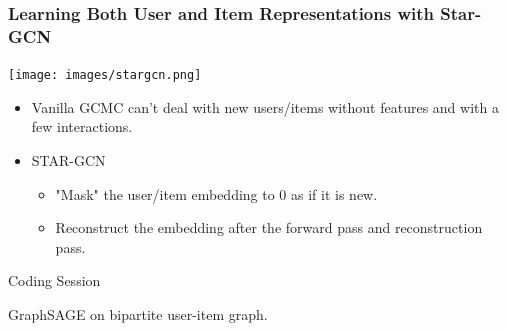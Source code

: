 \documentclass[11pt,aspectratio=169]{beamer}
\begin{document}
	\begin{frame}
		\frametitle{Learning Both User and Item Representations with Star-GCN}
		\begin{center}
			\centering
			\texttt{[image: images/stargcn.png]}
		\end{center}
		\begin{itemize}
			\item Vanilla GCMC can't deal with new users/items without features and with a few interactions.
			\item STAR-GCN
			\begin{itemize}
				\item "Mask" the user/item embedding to 0 as if it is new.
				\item Reconstruct the embedding after the forward pass and reconstruction pass.
			\end{itemize}
		\end{itemize}
	\end{frame}

	\begin{frame}
		\begin{center}
			\centering
			\Huge Coding Session
			
			\Large GraphSAGE on bipartite user-item graph.
		\end{center}
	\end{frame}
\end{document}
